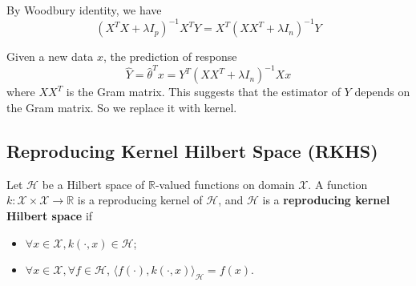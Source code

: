 \documentclass[12pt]{book}
\theoremstyle{definition}
\theoremstyle{remark}
\newcommand{\R}{\mathbb{R}}
\begin{document}
By Woodbury identity, we have \[(X^TX+\lambda I_p)^{-1}X^TY = X^T(XX^T+\lambda I_n)^{-1}Y\]

Given a new data $x$, the prediction of response
\[\hat{Y} = \hat{\theta}^Tx = Y^T(XX^T+\lambda I_n)^{-1}Xx\]
where $XX^T$ is the Gram matrix. This suggests that the estimator of $Y$ depends on the Gram matrix. So we replace it with kernel.


\subsection{Reproducing Kernel Hilbert Space (RKHS)}
Let $\mathcal{H}$ be a Hilbert space of $\R$-valued functions on domain $\mathcal{X}$. A function $k: \mathcal{X}\times \mathcal{X} \rightarrow\R$ is a reproducing kernel of $\mathcal{H}$, and $\mathcal{H}$ is a \textbf{reproducing kernel Hilbert space} if 
\begin{itemize}
    \item $\forall x\in\mathcal{X}, k(\cdot, x)\in \mathcal{H}$;
    \item $\forall x\in\mathcal{X}, \forall f \in \mathcal{H}$, $\langle f(\cdot), k(\cdot, x)\rangle_\mathcal{H} = f(x)$.
\end{itemize}
\end{document}
